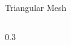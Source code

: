 \documentclass{beamer}
\begin{document}
\begin{frame}{Triangular Mesh}
\begin{columns}
    \begin{column}{0.3\pagewidth}
        \begin{figure}
            \centering

\end{figure}
\end{column}
\end{columns}
\end{frame}
\end{document}
